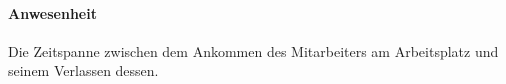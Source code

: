 \paragraph{Anwesenheit} Die Zeitspanne zwischen dem Ankommen des Mitarbeiters am Arbeitsplatz und seinem Verlassen dessen.







